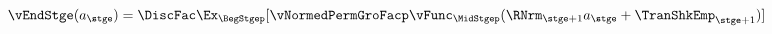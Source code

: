   \begin{equation}\begin{gathered}\begin{aligned}
        \vEndStge({a}_{\stge})  & = \DiscFac \Ex_{\BegStgep}[\vNormedPermGroFacp\null{\vFunc}_{\MidStgep}(\RNrm_{\stge+1} {a}_{\stge}+{\TranShkEmp}_{\stge+1})]  \label{eq:vEndtdefn}
      \end{aligned}\end{gathered}\end{equation}
